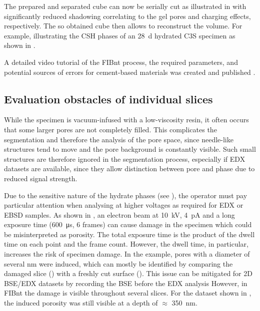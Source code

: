 The prepared and separated cube can now be serially cut as illustrated in  with significantly reduced shadowing correlating to the gel pores and charging effects, respectively.
The so obtained cube then allows to reconstruct the volume.
For example, illustrating the \ac{CSH} phases of an \qty{28}{\day} hydrated \ac{C3S} specimen as shown in .

A detailed video tutorial of the \ac{FIBnt} process, the required parameters, and potential sources of errors for cement-based materials was created and published \cite{kleiner.2025b}.

\subsection{Evaluation obstacles of individual slices}
\label{sec:fib_evaluation_obstacles}

While the specimen is vacuum-infused with a low-viscosity resin, it often occurs that some larger pores are not completely filled.
This complicates the segmentation and therefore the analysis of the pore space, since needle-like structures tend to move and the pore background is constantly visible.
Such small structures are therefore ignored in the segmentation process, especially if \ac{EDX} datasets are available, since they allow distinction between pore and phase due to reduced signal strength.

Due to the sensitive nature of the hydrate phases (see ), the operator must pay particular attention when analysing at higher voltages as required for \ac{EDX} or \ac{EBSD} samples.
As shown in , an electron beam at \qty{10}{\kilo\volt}, \qty{4}{\pico\ampere} and a long exposure time (\qty{600}{\micro\second}, \num{6} frames) can cause damage in the specimen which could be misinterpreted as porosity.
The total exposure time is the product of the dwell time on each point and the frame count.
However, the dwell time, in particular, increases the risk of specimen damage.
In the example, pores with a diameter of several \unit{\nano\meter} were induced, which can mostly be identified by comparing the damaged slice () with a freshly cut surface ().
This issue can be mitigated for 2D \ac{BSE}/\ac{EDX} datasets by recording the \ac{BSE} before the \ac{EDX} analysis
However, in \ac{FIBnt} the damage is visible throughout several slices.
For the dataset shown in , the induced porosity was still visible at a depth of $\approx$ \qty{350}{\nano\meter}.

